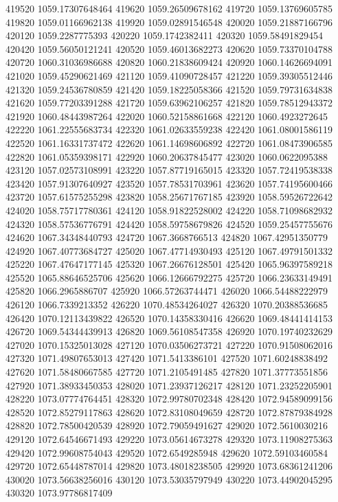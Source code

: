 {419520 1059.17307648464
419620 1059.26509678162
419720 1059.13769605785
419820 1059.01166962138
419920 1059.02891546548
420020 1059.21887166796
420120 1059.2287775393
420220 1059.1742382411
420320 1059.58491829454
420420 1059.56050121241
420520 1059.46013682273
420620 1059.73370104788
420720 1060.31036986688
420820 1060.21838609424
420920 1060.14626694091
421020 1059.45290621469
421120 1059.41090728457
421220 1059.39305512446
421320 1059.24536780859
421420 1059.18225058366
421520 1059.79731634838
421620 1059.77203391288
421720 1059.63962106257
421820 1059.78512943372
421920 1060.48443987264
422020 1060.52158861668
422120 1060.4923272645
422220 1061.22555683734
422320 1061.02633559238
422420 1061.08001586119
422520 1061.16331737472
422620 1061.14698606892
422720 1061.08473906585
422820 1061.05359398171
422920 1060.20637845477
423020 1060.0622095388
423120 1057.02573108991
423220 1057.87719165015
423320 1057.72419538338
423420 1057.91307640927
423520 1057.78531703961
423620 1057.74195600466
423720 1057.61575255298
423820 1058.25671767185
423920 1058.59526722642
424020 1058.75717780361
424120 1058.91822528002
424220 1058.71098682932
424320 1058.57536776791
424420 1058.59758679826
424520 1059.25457755676
424620 1067.34348440793
424720 1067.3668766513
424820 1067.42951350779
424920 1067.40773684727
425020 1067.47714930493
425120 1067.49791501332
425220 1067.47647177145
425320 1067.26676128501
425420 1065.96397589218
425520 1065.88646525706
425620 1066.12666792275
425720 1066.23633149491
425820 1066.2965886707
425920 1066.57263744471
426020 1066.54488222979
426120 1066.7339213352
426220 1070.48534264027
426320 1070.20388536685
426420 1070.12113439822
426520 1070.14358330416
426620 1069.48441414153
426720 1069.54344439913
426820 1069.56108547358
426920 1070.19740232629
427020 1070.15325013028
427120 1070.03506273721
427220 1070.91508062016
427320 1071.49807653013
427420 1071.5413386101
427520 1071.60248838492
427620 1071.58480667585
427720 1071.2105491485
427820 1071.37773551856
427920 1071.38933450353
428020 1071.23937126217
428120 1071.23252205901
428220 1073.07774764451
428320 1072.99780702348
428420 1072.94589099156
428520 1072.85279117863
428620 1072.83108049659
428720 1072.87879384928
428820 1072.78500420539
428920 1072.79059491627
429020 1072.5610030216
429120 1072.64546671493
429220 1073.05614673278
429320 1073.11908275363
429420 1072.99608754043
429520 1072.6549285948
429620 1072.59103460584
429720 1072.65448787014
429820 1073.48018238505
429920 1073.68361241206
430020 1073.56638256016
430120 1073.53035797949
430220 1073.44902045295
430320 1073.97786817409
}
